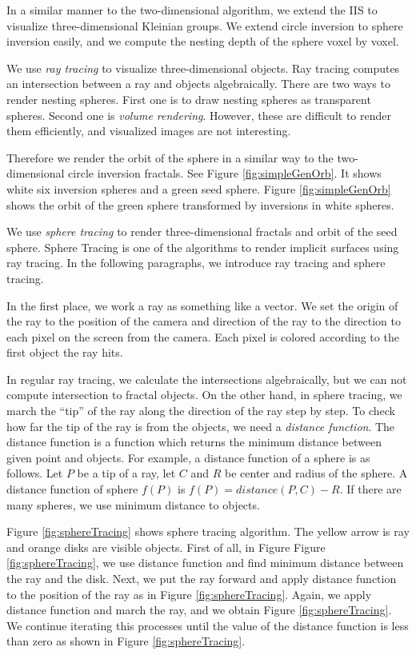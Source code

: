 In a similar manner to the two-dimensional algorithm,
we extend the IIS to visualize three-dimensional Kleinian groups.
We extend circle inversion to sphere inversion easily, and we
compute the nesting depth of the sphere voxel by voxel.

We use \textit{ray tracing} to visualize three-dimensional objects.
Ray tracing computes an intersection between a ray and objects
algebraically.
There are two ways to render nesting spheres. First one is to draw
nesting spheres as transparent spheres.
Second one is \textit{volume rendering}.
However, these are difficult to render them efficiently, and
visualized images are not interesting.

Therefore we render the orbit of the sphere in a similar way to the
two-dimensional circle inversion fractals.
See Figure \ref{fig:simpleGenOrb}. It shows
white six inversion spheres and a green seed sphere.
Figure \ref{fig:simpleGenOrb} shows the orbit of
the green sphere transformed by inversions in white spheres.

We use \textit{sphere tracing} \cite{hart1996sphere} to render three-dimensional
fractals and orbit of the seed sphere.
Sphere Tracing is one of the algorithms to render implicit surfaces using
ray tracing.
In the following paragraphs, we introduce ray tracing and
sphere tracing.

In the first place, we work a ray as something like a vector.
We set the origin of the ray to the position of the camera
and direction of the ray to the direction to each pixel on the screen
from the camera. Each pixel is colored according to the
first object the ray hits. 

In regular ray tracing, we calculate the intersections algebraically, but
we can not compute intersection to fractal objects.
On the other hand, in sphere tracing, we march the ``tip'' of the ray
along the direction of the ray step by step. 
To check how far the tip of the ray is from the objects, we need a
\textit{distance function}.
The distance function is a function which returns the minimum distance
between given point and objects.
For example, a distance function of a sphere is as follows.
Let $P$ be a tip of a ray, let $C$ and $R$ be center and
radius of the sphere.
A distance function of sphere $f(P)$ is $f(P) = distance(P, C) - R$.
If there are many spheres, we use minimum distance to objects.

Figure \ref{fig:sphereTracing} shows sphere tracing algorithm.
The yellow arrow is ray and orange disks are visible objects.
First of all, in Figure Figure \ref{fig:sphereTracing},
we use distance function and find minimum distance between
the ray and the disk.
Next, we put the ray forward and apply distance function to the position
of the ray as in Figure \ref{fig:sphereTracing}.
Again, we apply distance function and march the ray, and we obtain
Figure \ref{fig:sphereTracing}.
We continue iterating this processes until the value of the distance
function is less than zero as shown in Figure \ref{fig:sphereTracing}.

